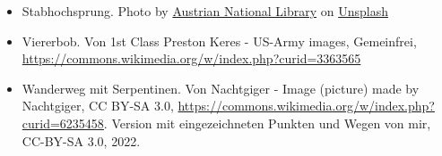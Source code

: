 \documentclass{beamer}
\begin{document}
\begin{frame}
\begin{tiny}
\begin{itemize}
\item
Stabhochsprung. Photo by \href{https://unsplash.com/@austriannationallibrary?utm_source=unsplash&utm_medium=referral&utm_content=creditCopyText}{Austrian National Library} on \href{https://unsplash.com/s/photos/pole-vault?utm_source=unsplash&utm_medium=referral&utm_content=creditCopyText}{Unsplash}

\item
Viererbob. Von 1st Class Preston Keres - US-Army images, Gemeinfrei, \url{https://commons.wikimedia.org/w/index.php?curid=3363565}

\item
  
Wanderweg mit Serpentinen. Von Nachtgiger - Image (picture) made by Nachtgiger, CC BY-SA 3.0, \url{https://commons.wikimedia.org/w/index.php?curid=6235458}. Version mit eingezeichneten Punkten und Wegen von mir, CC-BY-SA 3.0, 2022.

\end{itemize}
\end{tiny}
\end{frame}
\end{document}
